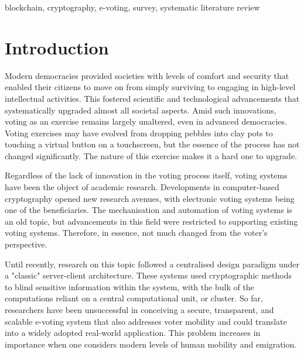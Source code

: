 \documentclass{ieeeaccess}
\begin{document}
\begin{keywords}
blockchain, cryptography, e-voting, survey, systematic literature review
\end{keywords}

\titlepgskip=-21pt

\maketitle

\section{Introduction}
    \label{sec:introduction}
    Modern democracies provided societies with levels of comfort and security that enabled their citizens to move on from simply surviving to engaging in high-level intellectual activities. This fostered scientific and technological advancements that systematically upgraded almost all societal aspects. Amid such innovations, voting as an exercise remains largely unaltered, even in advanced democracies. Voting exercises may have evolved from dropping pebbles into clay pots \cite{Jones2003} to touching a virtual button on a touchscreen, but the essence of the process has not changed significantly. The nature of this exercise makes it a hard one to upgrade.
    \par
    Regardless of the lack of innovation in the voting process itself, voting systems have been the object of academic research. Developments in computer-based cryptography opened new research avenues, with electronic voting systems being one of the beneficiaries. The mechanisation and automation of voting systems is an old topic, but advancements in this field were restricted to supporting existing voting systems. Therefore, in essence, not much changed from the voter's perspective.
    \par
    Until recently, research on this topic followed a centralised design paradigm under a "classic" server-client architecture. These systems used cryptographic methods to blind sensitive information within the system, with the bulk of the computations reliant on a central computational unit, or cluster. So far, researchers have been unsuccessful in conceiving a secure, transparent, and scalable e-voting system that also addresses voter mobility and could translate into a widely adopted real-world application. This problem increases in importance when one considers modern levels of human mobility and emigration.
    \par
\end{document}

